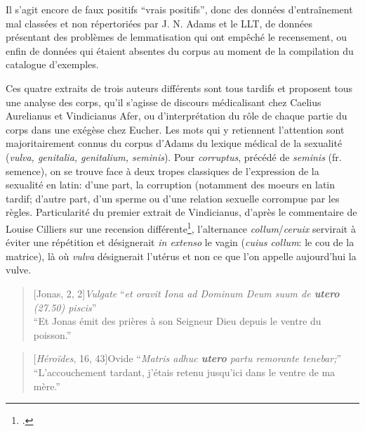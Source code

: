 Il s'agit encore de faux positifs \enquote{vrais positifs}, donc des données d'entraînement mal classées et non répertoriées par J. N. Adams et le LLT, de données présentant des problèmes de lemmatisation qui ont empêché le recensement, ou enfin de données qui étaient absentes du corpus au moment de la compilation du catalogue d'exemples.

Ces quatre extraits de trois auteurs différents sont tous tardifs et proposent tous une analyse des corps, qu'il s'agisse de discours médicalisant chez Caelius Aurelianus et Vindicianus Afer, ou d'interprétation du rôle de chaque partie du corps dans une exégèse chez Eucher. Les mots qui y retiennent l'attention sont majoritairement connus du corpus d'Adams du lexique médical de la sexualité (\textit{vulva, genitalia, genitalium, seminis}). Pour \textit{corruptus}, précédé de \textit{seminis} (fr. semence), on se trouve face à deux tropes classiques de l'expression de la sexualité en latin: d'une part, la corruption (notamment des moeurs en latin tardif; d'autre part, d'un sperme ou d'une relation sexuelle corrompue par les règles. Particularité du premier extrait de Vindicianus, d'après le commentaire de Louise Cilliers sur une recension différente\footcite[p.236]{cilliers_vindicianuss_2005}, l'alternance \textit{collum}/\textit{ceruix} servirait à éviter une répétition et désignerait \textit{in extenso} le vagin (\textit{cuius collum}: le cou de la matrice), là où \textit{vulva} désignerait l'utérus et non ce que l'on appelle aujourd'hui la vulve.

\starbreak

\begin{quote}[Jonas, 2, 2]{\textit{Vulgate}}
    \enquote{\textit{et oravit Iona ad Dominum Deum suum de \textbf{utero} (27.50) piscis}} \\
    \enquote{Et Jonas émit des prières à son Seigneur Dieu depuis le ventre du poisson.}
\end{quote}

\begin{quote}[\textit{Héroïdes}, 16, 43]{Ovide}
    \enquote{\textit{Matris adhuc \textbf{utero} partu remorante tenebar;}} \\
    \enquote{L'accouchement tardant, j'étais retenu jusqu'ici dans le ventre de ma mère.}
\end{quote} 

\starbreak

